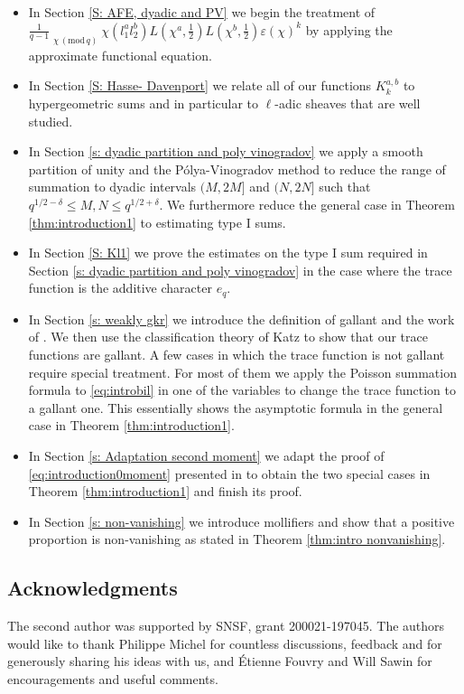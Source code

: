 \documentclass[12pt]{amsart}
\theoremstyle{plain}
\theoremstyle{definition}
\theoremstyle{remark}
\numberwithin{equation}{section}
\newcommand\sumst{\mathop{{\sum}^\ast}\limits}
\newcommand{\mods}[1]{\,(\mathrm{mod}\,{#1})}
\renewcommand{\leq}{\leqslant}
\begin{document}
\begin{itemize}
    \item 
In Section \ref{S: AFE, dyadic and PV} we begin the treatment of $ \frac{1}{q-1}\sumst_{\chi \mods{q}}\chi(l_1^al_2^b)L\left(\chi^a,\tfrac{1}{2}\right)L\left(\chi^b,\tfrac{1}{2}\right)\varepsilon(\chi)^k$ by applying the approximate functional equation. 
 \item In Section \ref{S: Hasse- Davenport} we relate all of our functions $K_k^{a,b}$ to hypergeometric sums and in particular to $\ell$-adic sheaves that are well studied. 
 \item In Section \ref{s: dyadic partition and poly vinogradov} we apply a smooth partition of unity and the P\'olya-Vinogradov method to reduce the range of summation to dyadic intervals $(M,2M]$ and $(N,2N]$ such that $q^{1/2-\delta}\leq M,N\leq q^{1/2+\delta}$. We furthermore reduce the general case in Theorem \ref{thm:introduction1} to estimating type I sums. 
 \item In Section \ref{S: Kl1} we 
 prove the estimates on the type I sum required in Section \ref{s: dyadic partition and poly vinogradov} in the case where the trace function is the additive character $e_q$.
 \item In Section \ref{s: weakly gkr} we introduce the definition of gallant and the work of \cite{FKMSbilinear}. We then use the classification theory of Katz to show that our trace functions are gallant. A few cases in which the trace function is not gallant require special treatment. For most of them we apply the Poisson summation formula to \eqref{eq:introbil} in one of the variables to change the trace function to a gallant one. This essentially shows the asymptotic formula in the general case in Theorem \ref{thm:introduction1}.
 \item In Section \ref{s: Adaptation second moment} we adapt the proof of \eqref{eq:introduction0moment} presented in \cite{FKMsecondmom} to obtain the two special cases in Theorem \ref{thm:introduction1} and finish its proof. 
 \item In Section \ref{s: non-vanishing} we introduce mollifiers and show that a positive proportion is non-vanishing as stated in Theorem \ref{thm:intro nonvanishing}. 


\end{itemize}





\subsection*{Acknowledgments}
The second author was supported by SNSF, grant 200021-197045. 
The authors would like to thank Philippe Michel for countless discussions, feedback and for generously sharing his ideas with us, and \'Etienne Fouvry and Will Sawin for encouragements and useful comments.    
\end{document}
